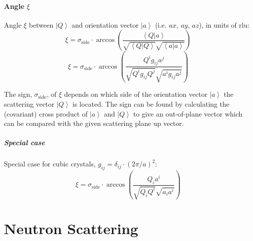 \documentclass[english]{book}
\begin{document}
\subsubsection*{Angle $\xi$}
Angle $\xi$ between $\left| Q \right>$ and orientation vector $\left| a \right>$ (i.e. $ax$, $ay$, $az$), in units of rlu:
\begin{equation} \xi = \sigma_{\mathrm{side}} \cdot \arccos \left( \frac{ \left< Q | a \right> }{ \sqrt{\left< Q | Q \right>} \sqrt{\left< a | a \right>} } \right) \end{equation}
\begin{equation} \boxed{ \xi = \sigma_{\mathrm{side}} \cdot \arccos \left( \frac{ Q^i g_{ij} a^j }{ \sqrt{Q^i g_{ij} Q^j} \sqrt{a^i g_{ij} a^j} } \right) } \end{equation}

The sign, $\sigma_{\mathrm{side}}$, of $\xi$ depends on which side of the orientation vector $\left| a \right>$ the scattering vector $\left| Q \right>$ 
is located. The sign can be found by calculating the (covariant) cross product of $\left| a \right>$ and $\left| Q \right>$ to give an out-of-plane vector 
which can be compared with the given scattering plane up vector.


\paragraph*{Special case}
Special case for cubic crystals, $g_{ij} = \delta_{ij} \cdot \left( 2\pi / a \right)^2$:
\begin{equation} \xi = \sigma_{\mathrm{side}} \cdot \arccos \left( \frac{ Q_i a^i }{ \sqrt{Q_i Q^i} \sqrt{a_i a^i} } \right) \end{equation}





\chapter{Neutron Scattering}
\end{document}
